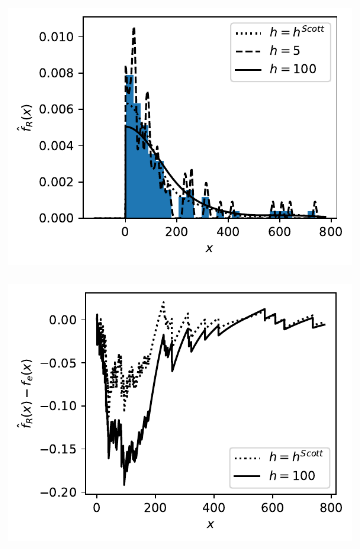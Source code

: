 \documentclass[../Thesis.tex]{subfiles}
\begin{document}
\begin{figure}[ht]
    \centering
    \begin{subfigure}[t]{0.49\linewidth}
        \centering
        \includegraphics[width = \linewidth]{figures/MI estimation/suicide data example - reflection.pdf}
        \caption{}
        \label{fig:suicide KDE example - reflected}
    \end{subfigure}
    \hfill
    \begin{subfigure}[t]{0.49\linewidth}
        \centering
        \includegraphics[width = \linewidth]{figures/MI estimation/suicide data example - reflection - Kolmogorov Smirnov.pdf}
        \caption{}
        \label{fig:Kolmogorov Smirnov DN}
    \end{subfigure}
    \caption{}
\end{figure}
\end{document}
